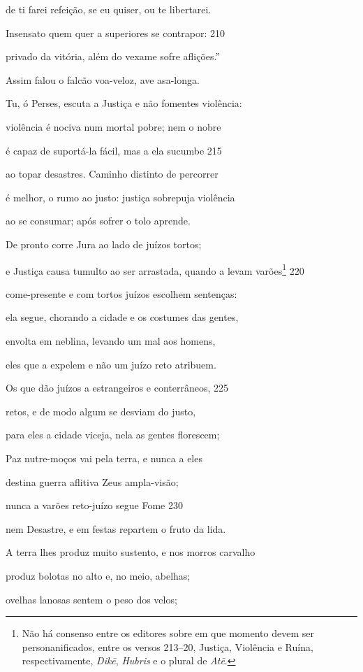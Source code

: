 de ti farei refeição, se eu quiser, ou te libertarei.

Insensato quem quer a superiores se contrapor: \num{210}

privado da vitória, além do vexame sofre aflições.''

Assim falou o falcão voa-veloz, ave asa-longa.

Tu, ó Perses, escuta a Justiça e não fomentes violência:

violência é nociva num mortal pobre; nem o nobre

é capaz de suportá-la fácil, mas a ela sucumbe \num{215}

ao topar desastres. Caminho distinto de percorrer

é melhor, o rumo ao justo: justiça sobrepuja violência

ao se consumar; após sofrer o tolo aprende.

De pronto corre Jura ao lado de juízos tortos;

e Justiça causa tumulto ao ser arrastada, quando a levam varões\footnote{Não há consenso entre os editores sobre em que momento devem ser
personanificados, entre os versos 213--20, Justiça, Violência e Ruína,
respectivamente, \emph{Dikē}, \emph{Hubris} e o plural de \emph{Atē}.} \num{220}

come-presente e com tortos juízos escolhem sentenças:

ela segue, chorando a cidade e os costumes das gentes,

envolta em neblina, levando um mal aos homens,

eles que a expelem e não um juízo reto atribuem.

Os que dão juízos a estrangeiros e conterrâneos, \num{225}

retos, e de modo algum se desviam do justo,

para eles a cidade viceja, nela as gentes florescem;

Paz nutre-moços vai pela terra, e nunca a eles

destina guerra aflitiva Zeus ampla-visão;

nunca a varões reto-juízo segue Fome \num{230}

nem Desastre, e em festas repartem o fruto da lida.

A terra lhes produz muito sustento, e nos morros carvalho

produz bolotas no alto e, no meio, abelhas;

ovelhas lanosas sentem o peso dos velos;


